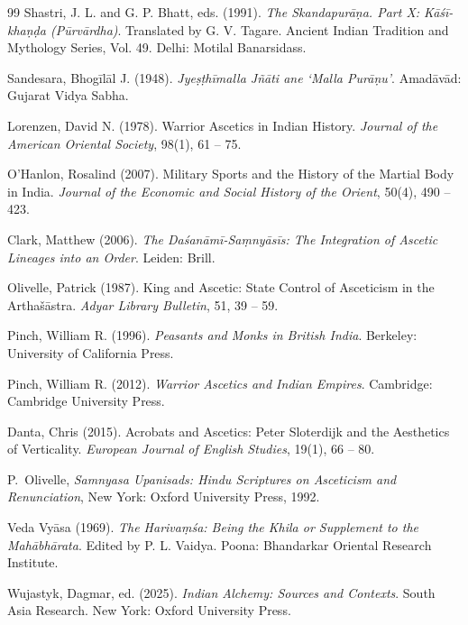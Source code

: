 \documentclass[11pt,twoside,letterpaper]{article}
\begin{document}
\begin{thebibliography}{99}
Shastri, J. L. and G. P. Bhatt, eds. (1991). \textit{The Skandapurāṇa. Part X: Kāśī-khaṇḍa (Pūrvārdha)}. Translated by G. V. Tagare. Ancient Indian Tradition and Mythology Series, Vol. 49. Delhi: Motilal Banarsidass.

Sandesara, Bhogīlāl J. (1948). \textit{Jyeṣṭhīmalla Jñāti ane `Malla Purāṇu'}. Amadāvād: Gujarat Vidya Sabha.

Lorenzen, David N. (1978). Warrior Ascetics in Indian History. \textit{Journal of the American Oriental Society}, 98(1), 61 -- 75.

O'Hanlon, Rosalind (2007). Military Sports and the History of the Martial Body in India. \textit{Journal of the Economic and Social History of the Orient}, 50(4), 490 -- 423.

Clark, Matthew (2006). \textit{The Daśanāmī-Saṃnyāsīs: The Integration of Ascetic Lineages into an Order}. Leiden: Brill.

Olivelle, Patrick (1987). King and Ascetic: State Control of Asceticism in the Artha\v{s}āstra. \textit{Adyar Library Bulletin}, 51, 39 -- 59.

Pinch, William R. (1996). \textit{Peasants and Monks in British India}. Berkeley: University of California Press.

Pinch, William R. (2012). \textit{Warrior Ascetics and Indian Empires}. Cambridge: Cambridge University Press.

Danta, Chris (2015). Acrobats and Ascetics: Peter Sloterdijk and the Aesthetics of Verticality. \textit{European Journal of English Studies}, 19(1), 66 -- 80.

P.~Olivelle, \emph{Samnyasa Upanisads: Hindu Scriptures on Asceticism and 
Renunciation}, New York: Oxford University Press, 1992.

Veda Vyāsa (1969). \textit{The Harivaṃśa: Being the Khila or Supplement to the Mahābhārata}. Edited by P. L. Vaidya. Poona: Bhandarkar Oriental Research Institute.

Wujastyk, Dagmar, ed. (2025). \textit{Indian Alchemy: Sources and Contexts}. South Asia Research. New York: Oxford University Press.


\end{thebibliography}
\end{document}
